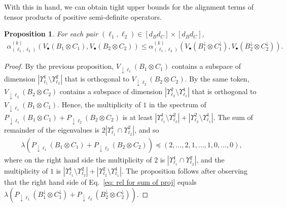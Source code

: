 \documentclass[12pt]{article}
\newtheorem{prop}[thm]{Proposition}
\theoremstyle{definition}
\numberwithin{equation}{section}
\numberwithin{equation}{section}
\newcommand{\al}{\alpha}
\newcommand{\la}{\lambda}
\newcommand{\Ups}{\Upsilon}
\newcommand{\da}{\downarrow}
\begin{document}
With this in hand, we can obtain tight upper bounds for the alignment terms of tensor products of positive semi-definite operators. 

\begin{prop}
\label{prop: bound for alignment terms}
For each pair \((\ell_1, \ell_2) \in [d_B d_C] \times [d_B d_C]\),
\begin{align*}
\al_{(\ell_1, \ell_2)}^{(k)} (V_{\bullet}(B_1 \otimes C_1), V_{\bullet}(B_2 \otimes C_2)) \leq \al_{(\ell_1, \ell_2)}^{(k)} (V_{
\bullet} (B_1^{\da} \otimes C_1^{\da}), V_{\bullet} (B_2^{\da} \otimes C_2^{\da})).
\end{align*}
\end{prop}
\begin{proof}
By the previous proposition, \(V_{\da \ell_1} (B_1 \otimes C_1)\) contains a subspace of dimension \(|\Ups^{1}_{\ell_1} \setminus \Ups^{2}_{\ell_2}|\) that is orthogonal to \(V_{\da \ell_2} (B_2 \otimes C_2)\). By the same token, \(V_{\da \ell_2} (B_2 \otimes C_2)\) contains a subspace of dimension \(|\Ups^{2}_{\ell_2} \setminus \Ups^{1}_{\ell_1}|\) that is orthogonal to \(V_{\da \ell_1} (B_1 \otimes C_1)\). Hence, the multiplicity of \(1\) in the spectrum of \(P_{\da \ell_1} (B_1 \otimes  C_1) + P_{\da \ell_2} (B_2 \otimes C_2)\) is at least \(|\Ups^{1}_{\ell_1} \setminus \Ups^{2}_{\ell_2}| +  |\Ups^{2}_{\ell_2} \setminus \Ups^{1}_{\ell_1}|\). The sum of remainder of the eigenvalues is \(2 | \Ups^{1}_{\ell_1} \cap \Ups^{2}_{\ell_2}|\), and so  
\begin{align}
\label{eq: rel for sum of proj}
\la(P_{\da \ell_1} (B_1 \otimes  C_1) + P_{\da \ell_2} (B_2 \otimes C_2)) \preceq (2, \ldots,2, 1, \ldots, 1, 0, \ldots, 0),
\end{align}
where on the right hand side the multiplicity of \(2\) is \(| \Ups^{1}_{\ell_1} \cap \Ups^{2}_{\ell_2}|\), and the multiplicity of \(1\) is \(|\Ups^{1}_{\ell_1} \setminus \Ups^{2}_{\ell_2}| +  |\Ups^{2}_{\ell_2} \setminus \Ups^{1}_{\ell_1}|\). The proposition follows after observing that the right hand side of Eq.~\ref{eq: rel for sum of proj} equals \(\la(P_{\da \ell_1} (B_1^{\da} \otimes  C_1^{\da}) + P_{\da \ell_2} (B_2^{\da} \otimes C_2^{\da}))\).\qedhere
\end{proof}
\end{document}
